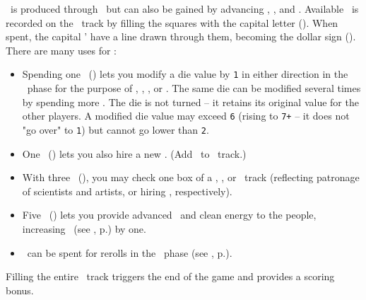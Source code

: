 \currency\ is produced through \factories\ but can also be gained by advancing \trade, \tech, and \culture.  Available \currency\ is recorded on the \currency\ track by filling the squares with the capital letter (\gaincurrency).  When spent, the capital \gaincurrency' have a line drawn through them, becoming the dollar sign (\spendcurrency).
There are many uses for \currency:
\begin{itemize}
  \item Spending one \currency\ (\spendcurrency) lets you modify a die value by \texttt{1} in either direction in the \development\ phase for the purpose of \construction, \activation, \trade, or \culture.  The same die can be modified several times by spending more \currency.  The die is not turned – it retains its original value for the other players.  A modified die value may exceed \texttt{6} (rising to \texttt{7+} – it does not "go over" to \texttt{1}) but cannot go lower than \texttt{2}.
  \item One \currency\ (\spendcurrency) lets you also hire a new \astronaut.  (Add \gainastronautsymbol\ to \population\ track.)
  \item With three \currency\ (\spendcurrency\spendcurrency\spendcurrency), you may check one box of a \tech, \culture, or \military\ track (reflecting patronage of scientists and artists, or hiring \pilots, respectively).
  \item Five \currency\ (\spendcurrency\spendcurrency\spendcurrency\spendcurrency\spendcurrency) lets you provide advanced \tech\ and clean energy to the people, increasing \happiness\ (see , p.\pageref{sec:happiness}) by one.
  \item \currency\ can be spent for rerolls in the \diplomacy\ phase (see , p.\pageref{sec:diplomacy}).
\end{itemize}
Filling the entire \currency\ track triggers the end of the game and provides a scoring bonus.
